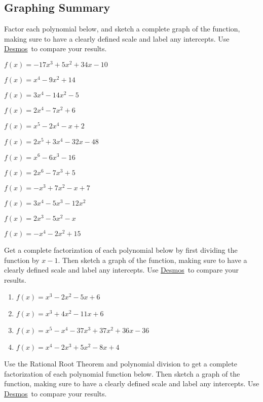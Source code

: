 \documentclass[12pt]{book}
\theoremstyle{definition}
\newcommand{\Desmos}{\href{https://www.desmos.com/}{Desmos}}
\begin{document}
\subsection*{Graphing Summary}
Factor each polynomial below, and sketch a complete graph of the function, making sure to have a clearly defined scale and label any intercepts.  Use \Desmos \ to compare your results.
\begin{enumerate}
\begin{multicols}{2}
	\item $f(x) = -17x^{3} + 5x^{2} + 34x - 10$
	\item $f(x) = x^4-9x^2+14$
	\item $f(x) = 3x^4-14x^2-5$
	\item $f(x) = 2x^4-7x^2+6$
	\item $f(x) = x^5-2x^4-x+2$
	\item $f(x) = 2x^5+3x^4-32x-48$
	\item $f(x) = x^6-6x^3-16$
	\item $f(x) = 2x^6-7x^3+5$
	\item $f(x) = -x^{3} + 7x^{2} - x + 7$
	\item $f(x) = 3x^4 - 5x^3 - 12x^2$
	\item $f(x) = 2x^3 - 5x^2 - x$
	\item $f(x) = -x^4-2x^2 +15$
\end{multicols}
\end{enumerate}
Get a complete factorization of each polynomial below by first dividing the function by $x-1$.  Then sketch a graph of the function, making sure to have a clearly defined scale and label any intercepts.  Use \Desmos \ to compare your results.
\begin{enumerate}[resume]
	\item $f(x) = x^{3} - 2x^{2} - 5x + 6$
	\item $f(x) = x^{3} + 4x^{2} - 11x + 6$
	\item $f(x)=x^5-x^4-37x^3+37x^2+36x-36$
	\item $f(x) = x^{4} -2x^3+ 5x^{2} - 8x + 4$
\end{enumerate}
Use the Rational Root Theorem and polynomial division to get a complete factorization of each polynomial function below.  Then sketch a graph of the function, making sure to have a clearly defined scale and label any intercepts.  Use \Desmos \ to compare your results.
\end{document}
